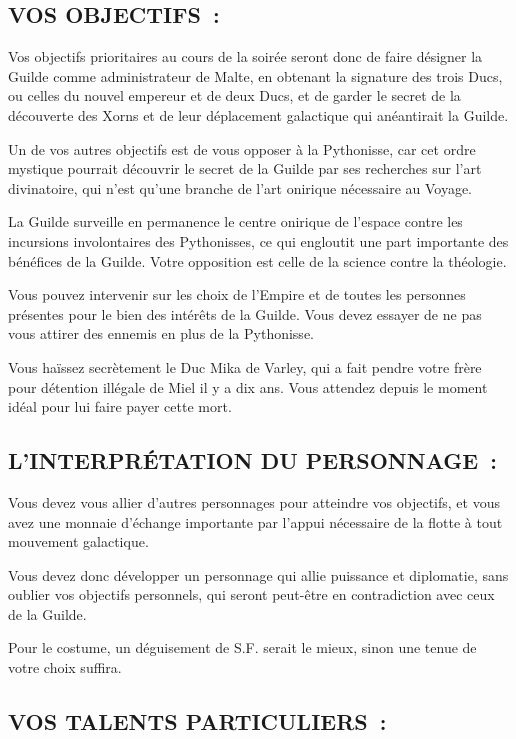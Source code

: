 \documentclass[14pt,twocolumn]{extarticle}
\begin{document}
\subsection{VOS OBJECTIFS~:}

Vos objectifs prioritaires au cours de la soirée seront donc de faire désigner
la Guilde comme administrateur de Malte, en obtenant la signature des trois
Ducs, ou celles du nouvel empereur et de deux Ducs, et de garder le secret de
la découverte des Xorns et de leur déplacement galactique qui anéantirait la
Guilde.

Un de vos autres objectifs est de vous opposer à la Pythonisse, car cet ordre
mystique pourrait découvrir le secret de la Guilde par ses recherches sur l'art
divinatoire, qui n'est qu'une branche de l'art onirique nécessaire au Voyage.

La Guilde surveille en permanence le centre onirique de l'espace contre les
incursions involontaires des Pythonisses, ce qui engloutit une part importante
des bénéfices de la Guilde. Votre opposition est celle de la science contre la
théologie.

Vous pouvez intervenir sur les choix de l'Empire et de toutes les personnes
présentes pour le bien des intérêts de la Guilde. Vous devez essayer de ne pas
vous attirer des ennemis en plus de la Pythonisse.

Vous haïssez secrètement le Duc Mika de Varley, qui a fait pendre votre frère
pour détention illégale de Miel il y a dix ans. Vous attendez depuis le moment
idéal pour lui faire payer cette mort.

\subsection{L'INTERPRÉTATION DU PERSONNAGE~:}

Vous devez vous allier d'autres personnages pour atteindre vos objectifs, et
vous avez une monnaie d'échange importante par l'appui nécessaire de la flotte
à tout mouvement galactique.

Vous devez donc développer un personnage qui allie puissance et diplomatie,
sans oublier vos objectifs personnels, qui seront peut-être en contradiction
avec ceux de la Guilde.

Pour le costume, un déguisement de S.F. serait le mieux, sinon une tenue de
votre choix suffira.

\subsection{VOS TALENTS PARTICULIERS~:}
\end{document}
